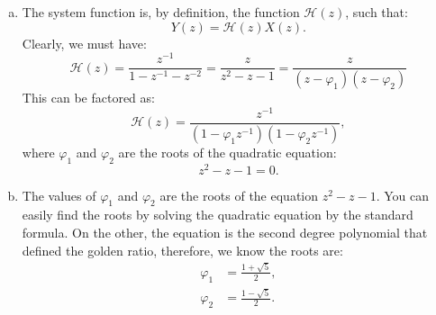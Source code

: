 \begin{enumerate}
\begin{enumerate}[a)]
              \item The system function is, by definition, the function $\mathcal{H}(z)$, such that:
                    \[Y(z)=\mathcal{H}(z)X(z).\]
                    Clearly, we must have:
                    \[\mathcal{H}(z)=\frac{z^{-1}}{1-z^{-1}-z^{-2}} = \frac{z}{z^{2} - z - 1} = \frac{z}{(z - \varphi_{1})(z - \varphi_{2})}\]
                    This can be factored as:
                    \[\mathcal{H}(z)=\frac{z^{-1}}{(1-\varphi_{1}z^{-1})(1-\varphi_{2}z^{-1})},\]
                    where $\varphi_{1}$ and $\varphi_{2}$ are the roots of the quadratic equation:
                    \[z^{2} - z - 1 = 0.\]

              \item The values of $\varphi_{1}$ and $\varphi_{2}$ are the roots of the equation $z^{2}-z-1$.
                    You can easily find the roots by solving the quadratic equation by the standard formula.
                    On the other, the equation is the second degree polynomial that defined the golden ratio,
                    therefore, we know the roots are:
                    \begin{align*}
                        \varphi_{1} & = \frac{1+\sqrt{5}}{2}, \\
                        \varphi_{2} & = \frac{1-\sqrt{5}}{2}.
                    \end{align*}


\end{enumerate}
\end{enumerate}

